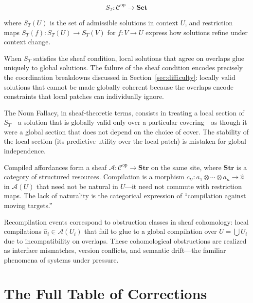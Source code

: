 \documentclass[12pt, a4paper]{article}
\theoremstyle{plain}
\theoremstyle{definition}
\theoremstyle{remark}
\begin{document}
$$S_T: \mathcal{C}^{\mathrm{op}} \to \mathbf{Set}$$

where $S_T(U)$ is the set of admissible solutions in context $U$, and
restriction maps $S_T(f): S_T(U) \to S_T(V)$ for $f: V \to U$ express how
solutions refine under context change.

When $S_T$ satisfies the sheaf condition, local solutions that agree on
overlaps glue uniquely to global solutions. The failure of the sheaf condition
encodes precisely the coordination breakdowns discussed in Section~\ref{sec:difficulty}:
locally valid solutions that cannot be made globally coherent because the
overlaps encode constraints that local patches can individually ignore.

The Noun Fallacy, in sheaf-theoretic terms, consists in treating a local
section of $S_T$---a solution that is globally valid only over a particular
covering---as though it were a global section that does not depend on the
choice of cover. The stability of the local section (its predictive utility
over the local patch) is mistaken for global independence.

Compiled affordances form a sheaf $\mathcal{A}: \mathcal{C}^{\mathrm{op}}
\to \mathbf{Str}$ on the same site, where $\mathbf{Str}$ is a category of
structured resources. Compilation is a morphism $c_U: a_1 \otimes \cdots
\otimes a_n \to \hat{a}$ in $\mathcal{A}(U)$ that need not be natural in
$U$---it need not commute with restriction maps. The lack of naturality
is the categorical expression of ``compilation against moving targets.''

Recompilation events correspond to obstruction classes in sheaf cohomology:
local compilations $\hat{a}_i \in \mathcal{A}(U_i)$ that fail to glue to a
global compilation over $U = \bigcup U_i$ due to incompatibility on overlaps.
These cohomological obstructions are realized as interface mismatches, version
conflicts, and semantic drift---the familiar phenomena of systems under
pressure.

\section{The Full Table of Corrections}
\label{app:table}
\end{document}
